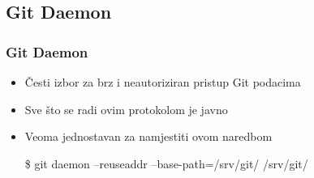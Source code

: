 \subsection{Git Daemon}

\begin{frame}
\frametitle{Git Daemon}
\begin{itemize}
	\item Česti izbor za brz i neautoriziran pristup Git podacima
	\item Sve što se radi ovim protokolom je javno
	\item Veoma jednostavan za namjestiti ovom naredbom

	\$ git daemon --reuseaddr --base-path=/srv/git/ /srv/git/
\end{itemize}
\end{frame}